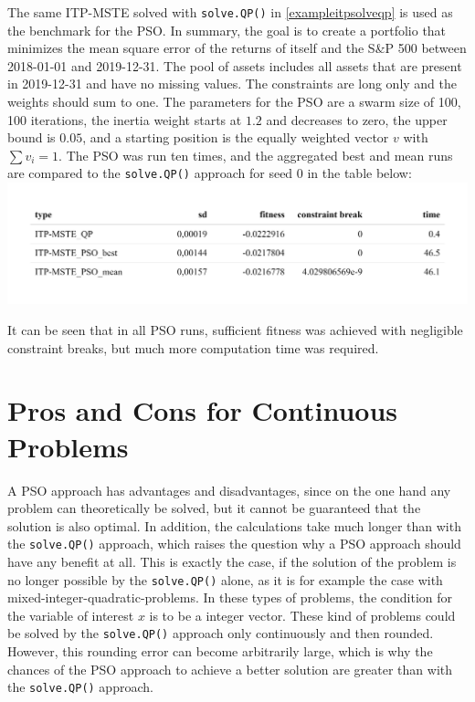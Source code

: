 \documentclass[
  oneside]{book}
\begin{document}
The same ITP-MSTE solved with \texttt{solve.QP()} in \ref{exampleitpsolveqp} is used as the benchmark for the PSO. In summary, the goal is to create a portfolio that minimizes the mean square error of the returns of itself and the S\&P 500 between 2018-01-01 and 2019-12-31. The pool of assets includes all assets that are present in 2019-12-31 and have no missing values. The constraints are long only and the weights should sum to one. The parameters for the PSO are a swarm size of 100, 100 iterations, the inertia weight starts at \(1.2\) and decreases to zero, the upper bound is \(0.05\), and a starting position is the equally weighted vector \(v\) with \(\textstyle\sum v_i=1\). The PSO was run ten times, and the aggregated best and mean runs are compared to the \texttt{solve.QP()} approach for seed 0 in the table below:
\includegraphics{Master_Thesis_files/figure-latex/pso8-1.png}

It can be seen that in all PSO runs, sufficient fitness was achieved with negligible constraint breaks, but much more computation time was required.

\hypertarget{pros-and-cons-for-continuous-problems}{%
\section{Pros and Cons for Continuous Problems}\label{pros-and-cons-for-continuous-problems}}

A PSO approach has advantages and disadvantages, since on the one hand any problem can theoretically be solved, but it cannot be guaranteed that the solution is also optimal. In addition, the calculations take much longer than with the \texttt{solve.QP()} approach, which raises the question why a PSO approach should have any benefit at all. This is exactly the case, if the solution of the problem is no longer possible by the \texttt{solve.QP()} alone, as it is for example the case with mixed-integer-quadratic-problems. In these types of problems, the condition for the variable of interest \(x\) is to be a integer vector. These kind of problems could be solved by the \texttt{solve.QP()} approach only continuously and then rounded. However, this rounding error can become arbitrarily large, which is why the chances of the PSO approach to achieve a better solution are greater than with the \texttt{solve.QP()} approach.
\end{document}
